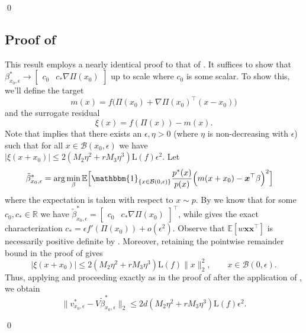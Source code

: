 \documentclass[11pt]{article}
\begin{document}
\begin{appendices}
\qed{}

\subsection{Proof of } \label{proof of population prop curve}

This result employs a nearly identical proof to that of . It suffices to show that $\beta^*_{x_0, \epsilon} \rightarrow  \begin{bmatrix}c_0 &  c_*\nabla \Pi(x_0)\end{bmatrix}$ up to scale where $c_0$ is some scalar. To show this, we'll define the  target  
\[m(x) = f\Big(\Pi(x_0) + \nabla \Pi(x_0)^{\top}(x-x_0)\Big)\]
and the surrogate residual 
\[\xi(x) = f(\Pi(x)) - m(x).\] Note that  implies that there exists an $\epsilon, \eta > 0$ (where $\eta$ is non-decreasing with $\epsilon$) such that for all $x \in \mathcal{B}(x_0, \epsilon)$ we have $|\xi(x + x_0)| \le 2(M_2\eta^2+rM_3\eta^3)\text{L}(f)\epsilon^2$. Let  
\begin{align}
    \tilde{\beta}^*_{x_0, \epsilon} &= \arg\min_{\beta}\mathbb{E}\Big[\mathbbm{1}_{\{x \in \mathcal{B}(0, \epsilon)\}}\frac{p^*(x)}{p(x)}\Big(m(x+x_0) - \boldsymbol{x}^{\top}\beta\Big)^2\Big] \label{eq: perturbed pop estimator curve}
\end{align}
where the expectation is taken with respect to $x \sim p$. By  we know that for some $c_0, c_* \in \mathbb{R}$ we have $\tilde{\beta}^*_{x_0, \epsilon}  =  \begin{bmatrix}
    c_0 & c_*\nabla \Pi(x_0)
\end{bmatrix}^{\top}$, while  gives the exact characterization $c_*=\epsilon f'(\Pi(x_0))+o(\epsilon^2)$. Observe that $\mathbb{E}[w\boldsymbol{x}\boldsymbol{x}^{\top}]$ is necessarily positive definite by . Moreover, retaining the pointwise remainder bound in the proof of  gives
\[
|\xi(x+x_0)|
\leq
2(M_2\eta^2+rM_3\eta^3)\mathrm{L}(f)\|x\|_2^2,
\qquad x\in\mathcal B(0,\epsilon).
\]
Thus, applying  and proceeding exactly as in the proof of  after the application of , we obtain
\[
\|v^*_{x_0,\epsilon}-V\tilde\beta^*_{x_0,\epsilon}\|_2
\leq
2d(M_2\eta^2+rM_3\eta^3)\mathrm{L}(f)\epsilon^2.
\]

\qed{}


\end{appendices}
\end{document}
